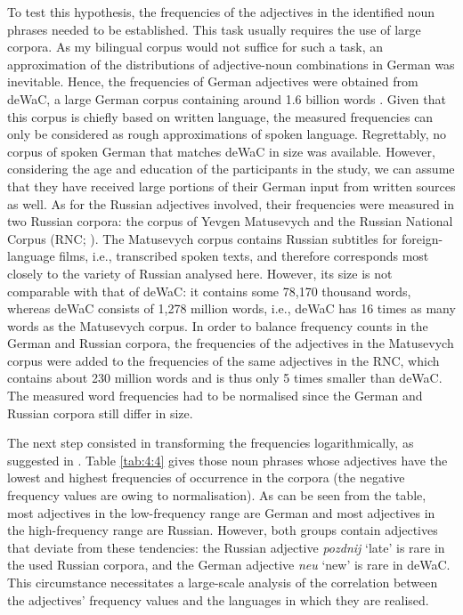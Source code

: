 To test this hypothesis, the frequencies of the adjectives in the identified noun phrases needed to be established. This task usually requires the use of large corpora. As my bilingual corpus would not suffice for such a task, an approximation of the distributions of adjective-noun combinations in German was inevitable. Hence, the frequencies of German adjectives were obtained from deWaC, a large German corpus containing around 1.6 billion words \citep{baroni2006}. Given that this corpus is chiefly based on written language, the measured frequencies can only be considered as rough approximations of spoken language. Regrettably, no corpus of spoken German that matches deWaC in size was available. However, considering the age and education of the participants in the study, we can assume that they have received large portions of their German input from written sources as well. As for the Russian adjectives involved, their frequencies were measured in two Russian corpora: the corpus of Yevgen Matusevych \citep{matusevych-etal} and the Russian National Corpus (RNC; \citeyear{rnc}). The Matusevych corpus contains Russian subtitles for foreign-language films, i.e., transcribed spoken texts, and therefore  corresponds most closely to the variety of Russian analysed here. However, its size is not comparable with that of deWaC: it contains some 78,170 thousand words, whereas deWaC consists of 1,278 million words, i.e., deWaC has 16 times as many words as the Matusevych corpus. In order to balance frequency counts in the German and Russian corpora, the frequencies of the adjectives in the Matusevych corpus were added to the frequencies of the same adjectives in the RNC, which contains about 230 million words and is thus only 5 times smaller than deWaC. The measured word frequencies had to be normalised since the German and Russian corpora still differ in size. 

The next step consisted in transforming the frequencies logarithmically, as suggested in \citet[][31]{baayen-analyzing}. Table \ref{tab:4:4} gives those noun phrases whose adjectives have the lowest and highest frequencies of occurrence in the corpora (the negative frequency values are owing to normalisation). As can be seen from the table, most adjectives in the low-frequency range are German and most adjectives in the high-frequency range are Russian. However, both groups contain adjectives that deviate from these tendencies: the Russian adjective \textit{pozdnij} `late' is rare in the used Russian corpora, and the German adjective \textit{neu} `new' is rare in deWaC. This circumstance necessitates a large-scale analysis of the correlation between the adjectives' frequency values and the languages in which they are realised.


